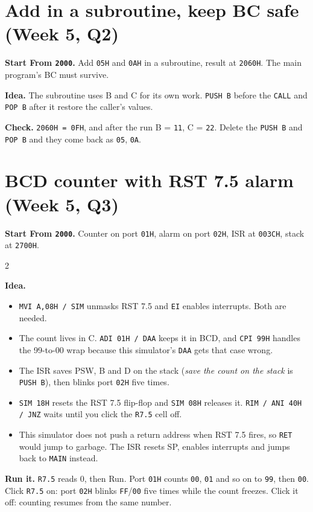 \documentclass[11pt,a4paper]{article}
\newcommand{\code}[1]{\texttt{#1}}
\newcommand{\prog}[2]{\needspace{12\baselineskip}\section{#1}\label{#2}}
\newcommand{\meta}[2]{\textbf{Start From \code{#1}.} #2\par}
\newcommand{\twocol}[3]{%
\begin{minipage}[t]{#1\textwidth}\vspace{0pt}\end{minipage}\hfill
\begin{minipage}[t]{\dimexpr0.97\textwidth-#1\textwidth\relax}\vspace{0pt}#3\end{minipage}\par}
\begin{document}
\prog{Add in a subroutine, keep BC safe (Week 5, Q2)}{p12}
\meta{2000}{Add \code{05H} and \code{0AH} in a subroutine, result at \code{2060H}. The main program's BC must survive.}
\twocol{0.34}{w5_q2_subroutine.asm}{%
\textbf{Idea.} The subroutine uses B and C for its own work. \code{PUSH B} before the \code{CALL} and \code{POP B} after it restore the caller's values.

\textbf{Check.} \code{2060H = 0FH}, and after the run B = \code{11}, C = \code{22}. Delete the \code{PUSH B} and \code{POP B} and they come back as \code{05}, \code{0A}.}

\newpage
\prog{BCD counter with RST 7.5 alarm (Week 5, Q3)}{p13}
\meta{2000}{Counter on port \code{01H}, alarm on port \code{02H}, ISR at \code{003CH}, stack at \code{2700H}.}
\begin{multicols}{2}

\end{multicols}
\textbf{Idea.}
\begin{itemize}[leftmargin=*]
\item \code{MVI A,08H / SIM} unmasks RST 7.5 and \code{EI} enables interrupts. Both are needed.
\item The count lives in C. \code{ADI 01H / DAA} keeps it in BCD, and \code{CPI 99H} handles the 99-to-00 wrap because this simulator's \code{DAA} gets that case wrong.
\item The ISR saves PSW, B and D on the stack (\emph{save the count on the stack} is \code{PUSH B}), then blinks port \code{02H} five times.
\item \code{SIM 18H} resets the RST 7.5 flip-flop and \code{SIM 08H} releases it. \code{RIM / ANI 40H / JNZ} waits until you click the \code{R7.5} cell off.
\item This simulator does not push a return address when RST 7.5 fires, so \code{RET} would jump to garbage. The ISR resets SP, enables interrupts and jumps back to \code{MAIN} instead.
\end{itemize}
\textbf{Run it.} \code{R7.5} reads 0, then Run. Port \code{01H} counts \code{00}, \code{01} and so on to \code{99}, then \code{00}. Click \code{R7.5} on: port \code{02H} blinks \code{FF}/\code{00} five times while the count freezes. Click it off: counting resumes from the same number.
\end{document}
